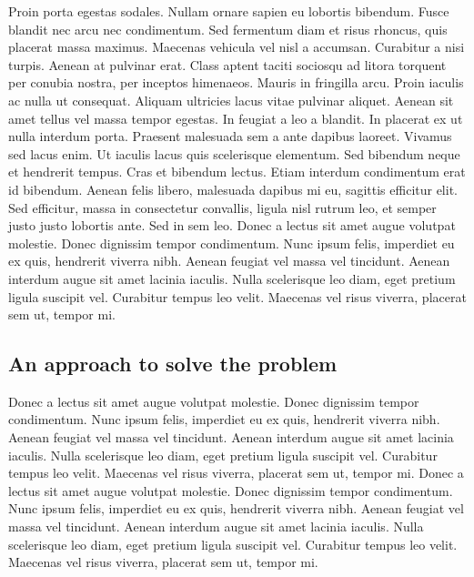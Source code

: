 \documentclass{article}
\begin{document}
\newline
Proin porta egestas sodales. Nullam ornare sapien eu lobortis bibendum. Fusce blandit nec arcu nec condimentum. Sed fermentum diam et risus rhoncus, quis placerat massa maximus. Maecenas vehicula vel nisl a accumsan. Curabitur a nisi turpis. Aenean at pulvinar erat.
\vspace{5mm}
\newline
Class aptent taciti sociosqu ad litora torquent per conubia nostra, per inceptos himenaeos. Mauris in fringilla arcu. Proin iaculis ac nulla ut consequat. Aliquam ultricies lacus vitae pulvinar aliquet. Aenean sit amet tellus vel massa tempor egestas. In feugiat a leo a blandit. In placerat ex ut nulla interdum porta. Praesent malesuada sem a ante dapibus laoreet. Vivamus sed lacus enim. Ut iaculis lacus quis scelerisque elementum. Sed bibendum neque et hendrerit tempus. Cras et bibendum lectus. Etiam interdum condimentum erat id bibendum. Aenean felis libero, malesuada dapibus mi eu, sagittis efficitur elit. Sed efficitur, massa in consectetur convallis, ligula nisl rutrum leo, et semper justo justo lobortis ante. Sed in sem leo.
\vspace{5mm}
\newline
Donec a lectus sit amet augue volutpat molestie. Donec dignissim tempor condimentum. Nunc ipsum felis, imperdiet
eu ex quis, hendrerit viverra nibh. Aenean feugiat vel massa vel tincidunt. Aenean interdum augue sit amet lacinia
iaculis. Nulla scelerisque leo diam, eget pretium ligula suscipit vel. Curabitur tempus leo velit. Maecenas vel
risus viverra, placerat sem ut, tempor mi.
\subsection{An approach to solve the problem}
Donec a lectus sit amet augue volutpat molestie. Donec dignissim tempor condimentum. Nunc ipsum felis, imperdiet
eu ex quis, hendrerit viverra nibh. Aenean feugiat vel massa vel tincidunt. Aenean interdum augue sit amet lacinia
iaculis. Nulla scelerisque leo diam, eget pretium ligula suscipit vel. Curabitur tempus leo velit. Maecenas vel
risus viverra, placerat sem ut, tempor mi.
\vspace{5mm}
\newline
Donec a lectus sit amet augue volutpat molestie. Donec dignissim tempor condimentum. Nunc ipsum felis, imperdiet
eu ex quis, hendrerit viverra nibh. Aenean feugiat vel massa vel tincidunt. Aenean interdum augue sit amet lacinia
iaculis. Nulla scelerisque leo diam, eget pretium ligula suscipit vel. Curabitur tempus leo velit. Maecenas vel
risus viverra, placerat sem ut, tempor mi.
\end{document}
